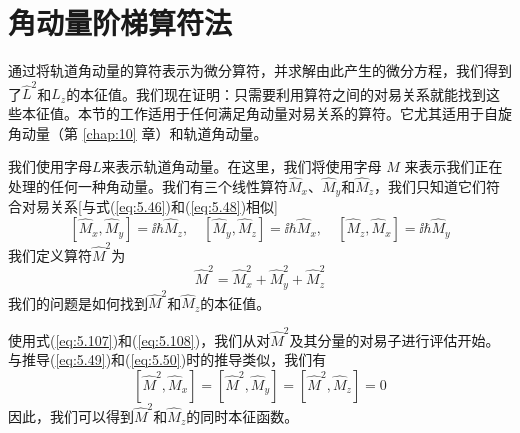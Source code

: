 \section{角动量阶梯算符法}
\label{sec:5.4 The Ladder-Operator Method for Angular Momentum}
    通过将轨道角动量的算符表示为微分算符，并求解由此产生的微分方程，我们得到了$\hat{L}^2$和$\hat{L}_z$的本征值。我们现在证明：只需要利用算符之间的对易关系就能找到这些本征值。本节的工作适用于任何满足角动量对易关系的算符。它尤其适用于自旋角动量（第 \ref{chap:10} 章）和轨道角动量。

    我们使用字母$L$来表示轨道角动量。在这里，我们将使用字母 $M$ 来表示我们正在处理的任何一种角动量。我们有三个线性算符$\hat{M}_x$、$\hat{M}_y$和$\hat{M}_z$，我们只知道它们符合对易关系[与式(\ref{eq:5.46})和(\ref{eq:5.48})相似]
    \begin{equation}
        \left[\hat{M}_x,\hat{M}_y\right] = \ii \hbar\hat{M}_z, \quad \left[\hat{M}_y,\hat{M}_z\right] = \ii \hbar\hat{M}_x, \quad \left[\hat{M}_z,\hat{M}_x\right] = \ii \hbar\hat{M}_y
        \label{eq:5.107}
    \end{equation}
    我们定义算符$\hat{M}^2$为
    \begin{equation}
        \hat{M}^2 = \hat{M}_x^2 + \hat{M}_y^2 + \hat{M}_z^2
        \label{eq:5.108}
    \end{equation}
    我们的问题是如何找到$\hat{M}^2$和$\hat{M}_z$的本征值。

    使用式(\ref{eq:5.107})和(\ref{eq:5.108})，我们从对$\hat{M}^2$及其分量的对易子进行评估开始。与推导(\ref{eq:5.49})和(\ref{eq:5.50})时的推导类似，我们有
    \begin{equation}
        \left[\hat{M}^2,\hat{M}_x\right] = \left[\hat{M}^2,\hat{M}_y\right] = \left[\hat{M}^2,\hat{M}_z\right] = 0
        \label{eq:5.109}
    \end{equation}
    因此，我们可以得到$\hat{M}^2$和$\hat{M}_z$的同时本征函数。

